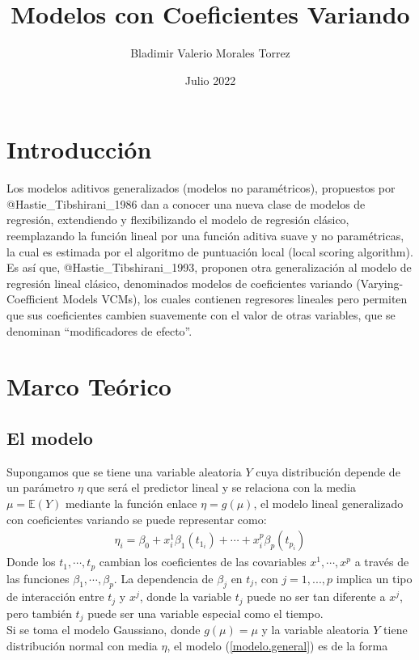 \documentclass[
]{article}
\title{Modelos con Coeficientes Variando}
\author{Bladimir Valerio Morales Torrez}
\date{Julio 2022}
\begin{document}
\maketitle

\hypertarget{introducciuxf3n}{%
\section{Introducción}\label{introducciuxf3n}}

Los modelos aditivos generalizados (modelos no paramétricos), propuestos
por @Hastie\_Tibshirani\_1986 dan a conocer una nueva clase de modelos
de regresión, extendiendo y flexibilizando el modelo de regresión
clásico, reemplazando la función lineal por una función aditiva suave y
no paramétricas, la cual es estimada por el algoritmo de puntuación
local (local scoring algorithm).\\
Es así que, @Hastie\_Tibshirani\_1993, proponen otra generalización al
modelo de regresión lineal clásico, denominados modelos de coeficientes
variando (Varying-Coefficient Models VCMs), los cuales contienen
regresores lineales pero permiten que sus coeficientes cambien
suavemente con el valor de otras variables, que se denominan
``modificadores de efecto''.

\hypertarget{marco-teuxf3rico}{%
\section{Marco Teórico}\label{marco-teuxf3rico}}

\hypertarget{el-modelo}{%
\subsection{El modelo}\label{el-modelo}}

Supongamos que se tiene una variable aleatoria \(Y\) cuya distribución
depende de un parámetro \(\eta\) que será el predictor lineal y se
relaciona con la media \(\mu=\mathbb{E}(Y)\) mediante la función enlace
\(\eta=g(\mu)\), el modelo lineal generalizado con coeficientes variando
se puede representar como: \begin{eqnarray}\label{modelo.general}
\eta_i=\beta_0+x_i^{1}\beta_1(t_{1_i})+\cdots+x_i^p\beta_p(t_{p_i})
\end{eqnarray} Donde los \(t_1,\cdots,t_p\) cambian los coeficientes de
las covariables \(x^1,\cdots,x^p\) a través de las funciones
\(\beta_1,\cdots,\beta_p\). La dependencia de \(\beta_j\) en \(t_j\),
con \(j=1,...,p\) implica un tipo de interacción entre \(t_j\) y
\(x^j\), donde la variable \(t_j\) puede no ser tan diferente a \(x^j\),
pero también \(t_j\) puede ser una variable especial como el tiempo.\\
Si se toma el modelo Gaussiano, donde \(g(\mu)=\mu\) y la variable
aleatoria \(Y\) tiene distribución normal con media \(\eta\), el modelo
(\ref{modelo.general}) es de la forma
\end{document}
